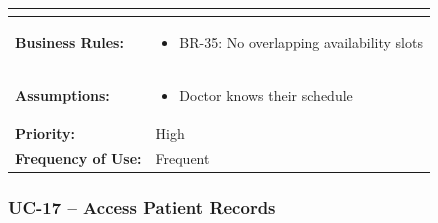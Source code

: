 \documentclass[12pt,a4paper]{article}
\begin{document}
\begin{longtable}{|p{4.5cm}|p{10.5cm}|}
\begin{itemize}
\end{itemize} \\
\hline
\textbf{Business Rules:} &
\begin{itemize}
  \item BR-35: No overlapping availability slots
\end{itemize} \\
\hline
\textbf{Assumptions:} &
\begin{itemize}
  \item Doctor knows their schedule
\end{itemize} \\
\hline
\textbf{Priority:} & High \\
\hline
\textbf{Frequency of Use:} & Frequent \\
\hline
\end{longtable}

\subsubsection{UC-17 – Access Patient Records}
\end{document}
